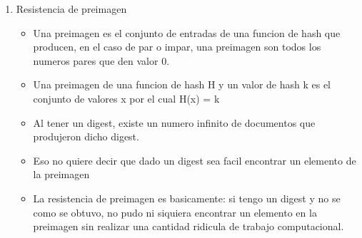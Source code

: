 \documentclass[11pt]{article}
\begin{document}
\begin{enumerate}
\item Resistencia de preimagen
\label{sec:orgd22355d}
\begin{itemize}
\item Una preimagen es el conjunto de entradas de una funcion de hash que producen, en el caso de par o impar, una preimagen son todos los numeros pares que den valor 0.
\item Una preimagen de una funcion de hash H y un valor de hash k es el conjunto de valores x por el cual H(x) = k

\item Al tener un digest, existe un numero infinito de documentos que produjeron dicho digest.
\item Eso no quiere decir que dado un digest sea facil encontrar un elemento de la preimagen

\item La resistencia de preimagen es basicamente: si tengo un digest y no se como se obtuvo, no pudo ni siquiera encontrar un elemento en la preimagen sin realizar una cantidad ridicula de trabajo computacional.


\end{itemize}
\end{enumerate}
\end{document}
